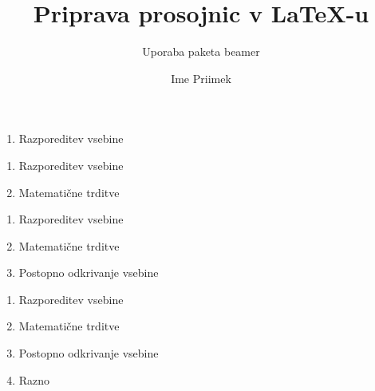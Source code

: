 \documentclass{beamer}
\begin{document}

\title{Priprava prosojnic v \LaTeX-u}
\subtitle{Uporaba paketa beamer}
\author{Ime Priimek}
\date{}

\begin{frame}
\titlepage
\end{frame}
\begin{frame}
	\begin{enumerate}
	\frametitle{Kratek pregled}
	\item
	Razporeditev vsebine
\end{enumerate}
\end{frame}

\begin{frame}
	\begin{enumerate}
	\frametitle{Kratek pregled}
	\item
	Razporeditev vsebine
	\item
	Matematične trditve
\end{enumerate}
\end{frame}

\begin{frame}
	\begin{enumerate}
	\frametitle{Kratek pregled}
	\item
	Razporeditev vsebine
	\item
	Matematične trditve
	\item
	Postopno odkrivanje vsebine
\end{enumerate}
\end{frame}

\begin{frame}
	\begin{enumerate}
	\frametitle{Kratek pregled}
	\item
	Razporeditev vsebine
	\item
	Matematične trditve
	\item
	Postopno odkrivanje vsebine
	\item
	Razno
\end{enumerate}
\end{frame}

\end{document}
